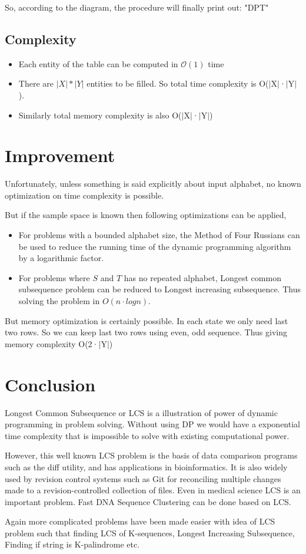 \documentclass{report}
\begin{document}
    
    So, according to the diagram, the procedure will finally print out: "DPT"
    
    \section{Complexity}
    \begin{itemize}
        \item Each entity of the table can be computed in $\mathcal{O}(1)$ time
        \item There are $|X|*|Y|$ entities to be filled. So total time complexity is O($|$X$|$·$|$Y$|$).
        \item Similarly total memory complexity is also O($|$X$|$·$|$Y$|$)
    \end{itemize}
    \chapter{Improvement}
    Unfortunately, unless something is said explicitly about input alphabet, no known optimization on time complexity is possible.
    
    \bigskip
    But if the sample space is known then following optimizations can be applied,
    \begin{itemize}
        \item For problems with a bounded alphabet size, the Method of Four Russians can be used to reduce the running time of the dynamic programming algorithm by a logarithmic factor.
        \item For problems where $S$ and $T$ has no repeated alphabet, Longest common subsequence problem can be reduced to Longest increasing subsequence. Thus solving the problem in $O(n\cdot logn)$.
    \end{itemize}
    \bigskip
    But memory optimization is certainly possible. In each state we
    only need last two rows. So we can keep last two rows using even,
    odd sequence. Thus giving memory complexity O(2·$|$Y$|$)
    
    \chapter{Conclusion}
    Longest Common Subsequence or LCS is a illustration of power of dynamic programming in problem solving. Without using DP we would have a exponential time complexity that is impossible to solve with existing computational power.
    
    \bigskip
    However, this well known LCS problem is the basis of data comparison programs such as the diff utility, and has applications in bioinformatics. It is also widely used by revision control systems such as Git for reconciling multiple changes made to a revision-controlled collection of files. Even in medical science LCS is an important problem. Fast DNA Sequence Clustering can be done based on LCS.  
    
    Again more complicated problems have been made easier with idea of LCS problem such that finding LCS of K-sequences, Longest Increasing Subsequence, Finding if string is K-palindrome etc.
    
    
\end{document}

